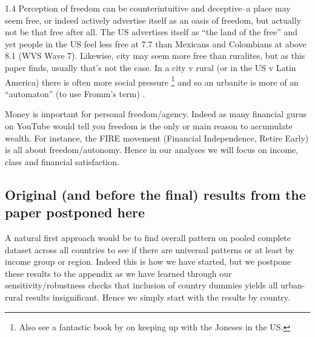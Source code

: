 \documentclass[10pt, letterpaper]{article}
\begin{document}
\begin{spacing}{1.4}
Perception of freedom can be counterintuitive and deceptive--a place may seem free, or indeed
actively advertise itself as an oasis of freedom, but actually not be that free
after all. 
 The US advertises itself
as ``the land of the free'' and yet people in the US feel less free at 7.7 than
Mexicans and Colombians at above 8.1 (WVS Wave 7). Likewise, city may seem more free than
ruralites, but as this paper finds, usually that's not the case.
In a city v rural (or in the US v Latin America) there is often  
 more social pressure \citep{colQolSwb25,unhappyBog26}\footnote{Also see a fantastic book by \citet{frank12} on
   keeping up with the Joneses in the US.} and so an urbanite is more of
 an ``automaton'' (to use Fromm's term)
 \citep{aok_free_from_to}.%



Money is important for personal freedom/agency. Indeed as many financial gurus on YouTube would
tell you freedom is the only or main reason to accumulate wealth. For instance, the FIRE movement (Financial Independence, Retire Early) is
all about freedom/autonomy. Hence in our analyses we will focus on income, class
and financial satisfaction.


\subsection{Original (and before the final) results from the paper postponed here}
 
A natural first approach would be to find overall pattern on pooled complete
dataset across all countries to see if there are universal patterns or at least by income group or
region. Indeed this is how we have started, but we postpone these results to the
appendix as we have learned through our sensitivity/robustness checks that
inclusion of country dummies yields all urban-rural results insignificant.
Hence we simply start with the results by country.


\end{spacing}
\end{document}

